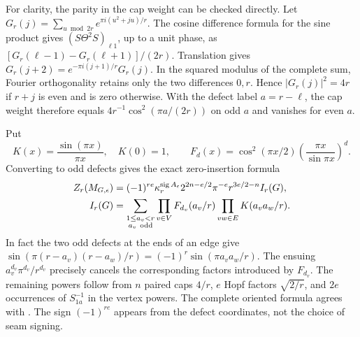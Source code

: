 For clarity, the parity in the cap weight can be checked directly.
Let \(G_r(j)=\sum_{u\bmod 2r}e^{\pi i(u^2+ju)/r}\). The cosine
difference formula for the sine product gives
\((S\Theta^2 S)_{\ell1}\), up to a unit phase, as
\([G_r(\ell-1)-G_r(\ell+1)]/(2r)\).
Translation gives \(G_r(j+2)=e^{-\pi i(j+1)/r}G_r(j)\).
In the squared modulus of the complete sum, Fourier orthogonality
retains only the two differences \(0,r\). Hence
\(\left|G_r(j)\right|^2=4r\) if \(r+j\) is even and is zero
otherwise. With the defect label \(a=r-\ell\), the cap weight
therefore equals \(4r^{-1}\cos^2(\pi a/(2r))\) on odd \(a\) and
vanishes for even \(a\).

Put
\[
 K(x)=\frac{\sin(\pi x)}{\pi x},\quad K(0)=1,\qquad
 F_d(x)=\cos^2(\pi x/2)\left(\frac{\pi x}{\sin\pi x}\right)^d .
\]
Converting to odd defects gives the exact zero-insertion formula
\begin{align}
 Z_r(M_{G,\epsilon})
 &=(-1)^{re}\kappa_r^{\operatorname{sig} A_\epsilon}
   2^{2n-e/2}\pi^{-e}r^{3e/2-n}I_r(G),\label{eq:finite}\\
 I_r(G)
 &= \sum_{\substack{1\le a_v<r\\ a_v\ {\rm odd}}}
       \prod_{v\in V}F_{d_v}(a_v/r)
       \prod_{vw\in E}K(a_v a_w/r).\notag
\end{align}
In fact the two odd defects at the ends of an edge give
\(\sin(\pi(r-a_v)(r-a_w)/r)=(-1)^r\sin(\pi a_va_w/r)\).
The ensuing \(a_v^{d_v}\pi^{d_v}/r^{d_v}\) precisely cancels the
corresponding factors introduced by \(F_{d_v}\).
The remaining powers follow from \(n\) paired caps \(4/r\),
\(e\) Hopf factors \(\sqrt{2/r}\), and \(2e\) occurrences of
\(S_{1a}^{-1}\) in the vertex powers. The complete oriented formula
agrees with \cite{P50,P50B}. The sign \((-1)^{re}\) appears from
the defect coordinates, not the choice of seam signing.

